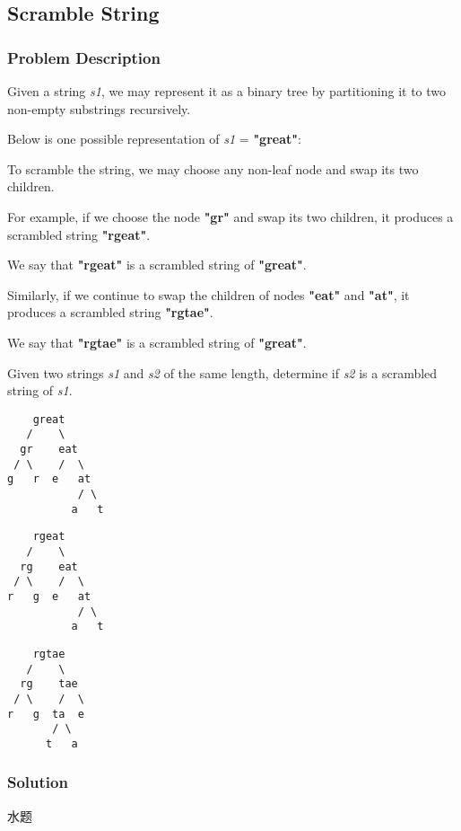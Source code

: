 \documentclass[courier]{article}
\begin{document}
\begin{CJK*}{UTF8}{gkai}
\subsection{ Scramble String }

\subsubsection*{Problem Description}
Given a string \emph{s1}, we may represent it as a binary tree by partitioning it to two non-empty substrings recursively.

Below is one possible representation of \emph{s1} = \textbf{"great"}:

To scramble the string, we may choose any non-leaf node and swap its two children.

For example, if we choose the node \textbf{"gr"} and swap its two children, it produces a scrambled string \textbf{"rgeat"}.

We say that \textbf{"rgeat"} is a scrambled string of \textbf{"great"}.

Similarly, if we continue to swap the children of nodes \textbf{"eat"} and \textbf{"at"}, it produces a scrambled string \textbf{"rgtae"}.

We say that \textbf{"rgtae"} is a scrambled string of \textbf{"great"}.

Given two strings \emph{s1} and \emph{s2} of the same length, determine if \emph{s2} is a scrambled string of \emph{s1}.

\begin{verbatim}
    great
   /    \
  gr    eat
 / \    /  \
g   r  e   at
           / \
          a   t
\end{verbatim}
\begin{verbatim}
    rgeat
   /    \
  rg    eat
 / \    /  \
r   g  e   at
           / \
          a   t
\end{verbatim}
\begin{verbatim}
    rgtae
   /    \
  rg    tae
 / \    /  \
r   g  ta  e
       / \
      t   a
\end{verbatim}


\subsubsection*{Solution}
水题


\end{CJK*}
\end{document}
